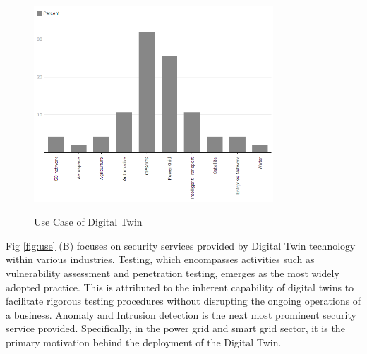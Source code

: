 \begin{figure}[H]    
    \caption{Use Case of Digital Twin}
        \includegraphics[width=0.8\textwidth]{images/rt/sector-dist.png}
    \label{fig:sector}
\end{figure}





Fig \ref{fig:use} (B) focuses on security services provided by Digital Twin technology within various industries. Testing, which encompasses activities such as vulnerability assessment and penetration testing, emerges as the most widely adopted practice. This is attributed to the inherent capability of digital twins to facilitate rigorous testing procedures without disrupting the ongoing operations of a business.  Anomaly and Intrusion detection is the next most prominent security service provided. Specifically, in the power grid and smart grid sector, it is the primary motivation behind the deployment of the Digital Twin.


